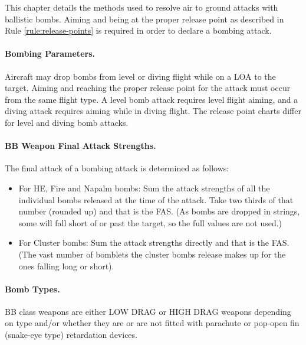 

\label{rules:bombing-attacks}

This chapter details the methods used to resolve air to ground attacks with ballistic bombs. Aiming and being at the proper release point as described in Rule \ref{rule:release-points} is required in order to declare a bombing attack.

\paragraph{Bombing Parameters.} Aircraft may drop bombs from level or diving flight while on a LOA to the target. Aiming and reaching the proper release point for the attack must occur from the same flight type. A level bomb attack requires level flight aiming, and a diving attack requires aiming while in diving flight. The release point charts differ for level and diving bomb attacks.

\paragraph{BB Weapon Final Attack Strengths.} The final attack of a bombing attack is determined as follows:

\begin{itemize}

    \item 
For HE, Fire and Napalm bombs: Sum the attack strengths of all the individual bombs released at the time of the attack. Take two thirds of that number (rounded up) and that is the FAS. (As bombs are dropped in strings, some will fall short of or past the target, so the full values are not used.)

    \item For Cluster bombs: Sum the attack strengths directly and that is the FAS. (The vast number of bomblets the cluster bombs release makes up for the ones falling long or short).

\end{itemize}

\paragraph{Bomb Types.} BB class weapons are either LOW DRAG or HIGH DRAG weapons depending on type and/or whether they are or are not fitted with parachute or pop-open fin (snake-eye type) retardation devices.

